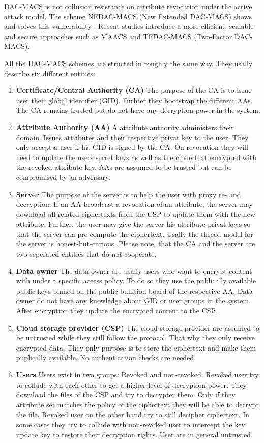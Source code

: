 DAC-MACS is not collusion resistance on attribute revocation under the active attack model. The scheme NEDAC-MACS (New Extended DAC-MACS) shows and solves this vulnerability \cite{wu2017security}. Recent studies introduce a more efficient, scalable and secure approaches such as MAACS \cite{li2016secure} and TFDAC-MACS (Two-Factor DAC-MACS)\cite{li2017two}. 

All the DAC-MACS schemes are structed in roughly the same way. They usally describe six different entities:

\begin{enumerate}
	\item \textbf{Certificate/Central Authority (CA)} The purpose of the CA is to issue user their global identifier (GID). Furhter they bootstrap the different AAs. The CA remains trusted but do not have any decryption power in the system. 
	\item \textbf{Attribute Authority (AA)} A attribute authority administers their domain. Issues attributes and their respective privat key to the user. They only accept a user if his GID is signed by the CA. 
	On revocation they will need to update the users secret keys as well as the ciphertext encrypted with the revoked attribute key. AAs are assumed to be trusted but can be compromised by an adversary.
	\item \textbf{Server} The purpose of the server is to help the user with proxy re- and decryption. If an AA broadcast a revocation of an attribute, the server may download all related ciphertexts from the CSP to update them with the new attribute. 
	Further, the user may give the server his attribute privat keys so that the server can pre compute the ciphertext. Usally the thread model for the server is honest-but-curious. Please note, that the CA and the server are two seperated entities that do not cooperate.
	\item \textbf{Data owner} The data owner are usally users who want to encrypt content with under a specific access policy. To do so they use the publically available public keys pinned on the public bullition board of the respective AA. Data owner do not have any knowledge about GID or user groups in the system. After encryption they update the encrypted content to the CSP.
	\item \textbf{Cloud storage provider (CSP)} The cloud storage provider are assumed to be untrusted while they still follow the protocol. That why they only receive encrypted data. They only purpose is to store the ciphertext and make them puplically available. No authentication checks are needed.
	\item \textbf{Users} Users exist in two groups: Revoked and non-revoked. Revoked user try to collude with each other to get a higher level of decryption power. They download the files of the CSP and try to decrypter them. Only if they attribute set matches the policy of the ciphertext they will be able to decrypt the file. 
	Revoked user on the other hand try to still decipher ciphertext. In some cases they try to collude with non-revoked user to intercept the key update key to restore their decryption rights. 
	User are in general untrusted.
\end{enumerate} 

